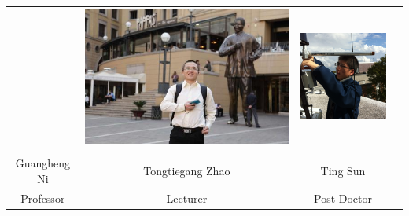 \documentclass{beamer}
\begin{document}
\begin{CJK}{UTF8}{gkai}
{{\begin{table}
{\begin{tabular}{cccc}
&\begin{minipage}{.3\textwidth}\includegraphics[width=\linewidth]{tongtiegangzhao.jpg}\end{minipage} 
&\begin{minipage}{.3\textwidth}\includegraphics[width=\linewidth]{tingsun.png}\end{minipage}
\\
\\
\hline
Guangheng Ni & Tongtiegang Zhao &Ting Sun \\
Professor& Lecturer & Post Doctor\\
\hline
\end{tabular}
}
\end{table}
  }
 
}
\end{CJK}
\end{document}
